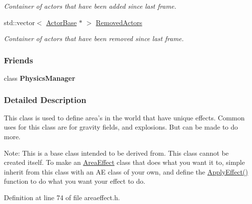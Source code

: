 \begin{DoxyCompactItemize}
\begin{DoxyCompactList}\small\item\em Container of actors that have been added since last frame. \item\end{DoxyCompactList}\item 
\hypertarget{classphys_1_1AreaEffect_a1b1b6cced61ead4d6de3d8bad5c2125a}{
std::vector$<$ \hyperlink{classphys_1_1ActorBase}{ActorBase} $\ast$ $>$ \hyperlink{classphys_1_1AreaEffect_a1b1b6cced61ead4d6de3d8bad5c2125a}{RemovedActors}}
\label{d4/d55/classphys_1_1AreaEffect_a1b1b6cced61ead4d6de3d8bad5c2125a}

\begin{DoxyCompactList}\small\item\em Container of actors that have been removed since last frame. \item\end{DoxyCompactList}\end{DoxyCompactItemize}
\subsubsection*{Friends}
\begin{DoxyCompactItemize}
\item 
\hypertarget{classphys_1_1AreaEffect_a139cf05ac01161b7071c8a037c841683}{
class {\bfseries PhysicsManager}}
\label{d4/d55/classphys_1_1AreaEffect_a139cf05ac01161b7071c8a037c841683}

\end{DoxyCompactItemize}


\subsubsection{Detailed Description}
This class is used to define area's in the world that have unique effects. Common uses for this class are for gravity fields, and explosions. But can be made to do more. \par
 Note: This is a base class intended to be derived from. This class cannot be created itself. To make an \hyperlink{classphys_1_1AreaEffect}{AreaEffect} class that does what you want it to, simple inherit from this class with an AE class of your own, and define the \hyperlink{classphys_1_1AreaEffect_a3b285ecfcf9c9200662d510e48dd222a}{ApplyEffect()} function to do what you want your effect to do. 

Definition at line 74 of file areaeffect.h.



